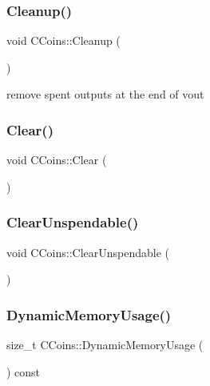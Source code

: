 \subsubsection{\texorpdfstring{Cleanup()}{Cleanup()}}
{\footnotesize\ttfamily void C\+Coins\+::\+Cleanup (\begin{DoxyParamCaption}{ }\end{DoxyParamCaption})\hspace{0.3cm}{\ttfamily [inline]}}



remove spent outputs at the end of vout 

\mbox{\label{class_c_coins_a4d4197688436b752234bea95f0230b82}} 
\subsubsection{\texorpdfstring{Clear()}{Clear()}}
{\footnotesize\ttfamily void C\+Coins\+::\+Clear (\begin{DoxyParamCaption}{ }\end{DoxyParamCaption})\hspace{0.3cm}{\ttfamily [inline]}}

\mbox{\label{class_c_coins_ad8b649abb32bdba255adec6dcfd57fc5}} 
\subsubsection{\texorpdfstring{Clear\+Unspendable()}{ClearUnspendable()}}
{\footnotesize\ttfamily void C\+Coins\+::\+Clear\+Unspendable (\begin{DoxyParamCaption}{ }\end{DoxyParamCaption})\hspace{0.3cm}{\ttfamily [inline]}}

\mbox{\label{class_c_coins_a8fe3cbe74c622a41d97a19741aa046b5}} 
\subsubsection{\texorpdfstring{Dynamic\+Memory\+Usage()}{DynamicMemoryUsage()}}
{\footnotesize\ttfamily size\+\_\+t C\+Coins\+::\+Dynamic\+Memory\+Usage (\begin{DoxyParamCaption}{ }\end{DoxyParamCaption}) const\hspace{0.3cm}{\ttfamily [inline]}}


